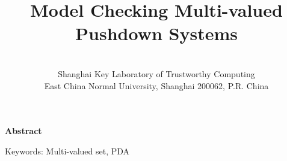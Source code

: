 \documentclass[12pt]{article}
\title{ Model Checking  Multi-valued Pushdown Systems }
\author{
\\
  { Shanghai Key Laboratory of Trustworthy Computing}\\ {\small East China Normal University, Shanghai 200062,
P.R. China}}
\date{}
\begin{document}
\maketitle

\begin{center}
{\bf Abstract}
\end{center}


Keywords: Multi-valued set, PDA

\thispagestyle{fancyplain} \fancyhead{}










\end{document}
